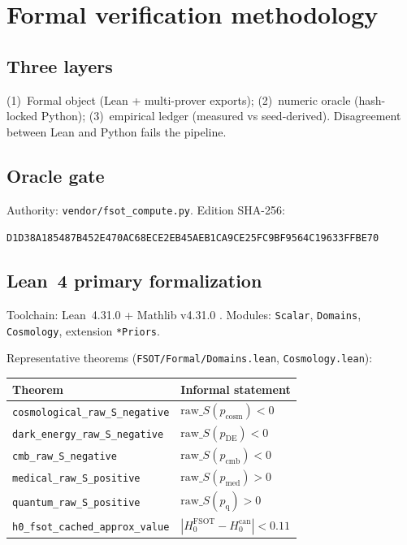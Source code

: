 \documentclass[11pt,a4paper]{article}
\begin{document}
\section{Formal verification methodology}
\label{sec:formal}

\subsection{Three layers}

(1)~Formal object (Lean + multi-prover exports);
(2)~numeric oracle (hash-locked Python);
(3)~empirical ledger (measured vs seed-derived).
Disagreement between Lean and Python fails the pipeline.

\subsection{Oracle gate}

Authority: \texttt{vendor/fsot\_compute.py}.
Edition SHA-256:
\begin{center}
\texttt{D1D38A185487B452E470AC68ECE2EB45AEB1CA9CE25FC9BF9564C19633FFBE70}
\end{center}

\subsection{Lean~4 primary formalization}

Toolchain: Lean~4.31.0 + Mathlib v4.31.0 \cite{Lean4,Mathlib}.
Modules: \texttt{Scalar}, \texttt{Domains}, \texttt{Cosmology}, extension
\texttt{*Priors}.

Representative theorems (\texttt{FSOT/Formal/Domains.lean},
\texttt{Cosmology.lean}):

\begin{center}
\begin{tabular}{@{}ll@{}}
\toprule
Theorem & Informal statement \\
\midrule
\texttt{cosmological\_raw\_S\_negative} & $\mathrm{raw}\_S(p_{\mathrm{cosm}})<0$ \\
\texttt{dark\_energy\_raw\_S\_negative} & $\mathrm{raw}\_S(p_{\mathrm{DE}})<0$ \\
\texttt{cmb\_raw\_S\_negative} & $\mathrm{raw}\_S(p_{\mathrm{cmb}})<0$ \\
\texttt{medical\_raw\_S\_positive} & $\mathrm{raw}\_S(p_{\mathrm{med}})>0$ \\
\texttt{quantum\_raw\_S\_positive} & $\mathrm{raw}\_S(p_{\mathrm{q}})>0$ \\
\texttt{h0\_fsot\_cached\_approx\_value} &
  $|H_0^{\mathrm{FSOT}}-H_0^{\mathrm{can}}|<0.11$ \\
\bottomrule
\end{tabular}
\end{center}
\end{document}
